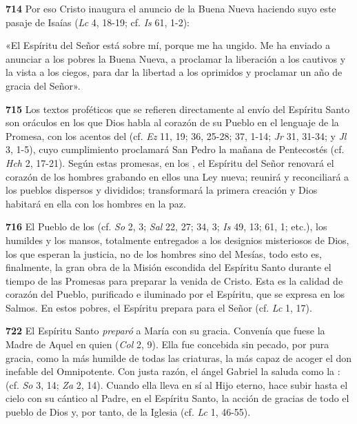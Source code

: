 \textbf{714} Por eso Cristo inaugura el anuncio de la Buena Nueva haciendo suyo este pasaje de Isaías (\emph{Lc} 4, 18-19; cf. \emph{Is} 61, 1-2):

«El Espíritu del Señor está sobre mí, porque me ha ungido. Me ha enviado a anunciar a los pobres la Buena Nueva, a proclamar la liberación a los cautivos y la vista a los ciegos, para dar la libertad a los oprimidos y proclamar un año de gracia del Señor».

\textbf{715} Los textos proféticos que se refieren directamente al envío del Espíritu Santo son oráculos en los que Dios habla al corazón de su Pueblo en el lenguaje de la Promesa, con los acentos del  (cf. \emph{Ez} 11, 19; 36, 25-28; 37, 1-14; \emph{Jr} 31, 31-34; y \emph{Jl} 3, 1-5), cuyo cumplimiento proclamará San Pedro la mañana de Pentecostés (cf. \emph{Hch} 2, 17-21). Según estas promesas, en los , el Espíritu del Señor renovará el corazón de los hombres grabando en ellos una Ley nueva; reunirá y reconciliará a los pueblos dispersos y divididos; transformará la primera creación y Dios habitará en ella con los hombres en la paz.

\textbf{716} El Pueblo de los  (cf. \emph{So} 2, 3; \emph{Sal} 22, 27; 34, 3; \emph{Is} 49, 13; 61, 1; etc.), los humildes y los mansos, totalmente entregados a los designios misteriosos de Dios, los que esperan la justicia, no de los hombres sino del Mesías, todo esto es, finalmente, la gran obra de la Misión escondida del Espíritu Santo durante el tiempo de las Promesas para preparar la venida de Cristo. Esta es la calidad de corazón del Pueblo, purificado e iluminado por el Espíritu, que se expresa en los Salmos. En estos pobres, el Espíritu prepara para el Señor  (cf. \emph{Lc} 1, 17).

\textbf{722} El Espíritu Santo \emph{preparó} a María con su gracia. Convenía que fuese  la Madre de Aquel en quien  (\emph{Col} 2, 9). Ella fue concebida sin pecado, por pura gracia, como la más humilde de todas las criaturas, la más capaz de acoger el don inefable del Omnipotente. Con justa razón, el ángel Gabriel la saluda como la :  (cf. \emph{So} 3, 14; \emph{Za} 2, 14). Cuando ella lleva en sí al Hijo eterno, hace subir hasta el cielo con su cántico al Padre, en el Espíritu Santo, la acción de gracias de todo el pueblo de Dios y, por tanto, de la Iglesia (cf. \emph{Lc} 1, 46-55).

